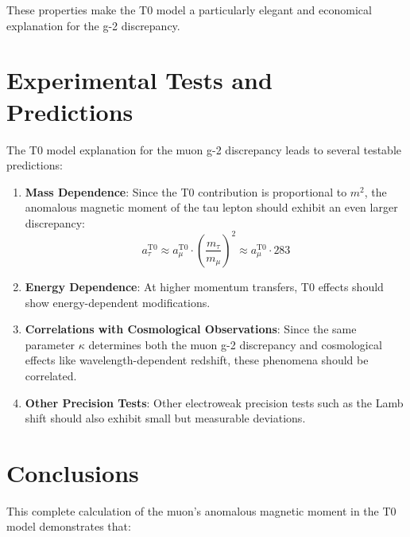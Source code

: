 \documentclass[12pt,a4paper]{article}
\begin{document}
	These properties make the T0 model a particularly elegant and economical explanation for the g-2 discrepancy.
	
	\section{Experimental Tests and Predictions}
	
	The T0 model explanation for the muon g-2 discrepancy leads to several testable predictions:
	
	\begin{enumerate}
		\item \textbf{Mass Dependence}: Since the T0 contribution is proportional to $m^2$, the anomalous magnetic moment of the tau lepton should exhibit an even larger discrepancy:
		\begin{equation}
			a_\tau^{\text{T0}} \approx a_\mu^{\text{T0}} \cdot \left(\frac{m_\tau}{m_\mu}\right)^2 \approx a_\mu^{\text{T0}} \cdot 283
		\end{equation}
		
		\item \textbf{Energy Dependence}: At higher momentum transfers, T0 effects should show energy-dependent modifications.
		
		\item \textbf{Correlations with Cosmological Observations}: Since the same parameter $\kappa$ determines both the muon g-2 discrepancy and cosmological effects like wavelength-dependent redshift, these phenomena should be correlated.
		
		\item \textbf{Other Precision Tests}: Other electroweak precision tests such as the Lamb shift should also exhibit small but measurable deviations.
	\end{enumerate}
	
	\section{Conclusions}
	
	This complete calculation of the muon's anomalous magnetic moment in the T0 model demonstrates that:
	
\end{document}
